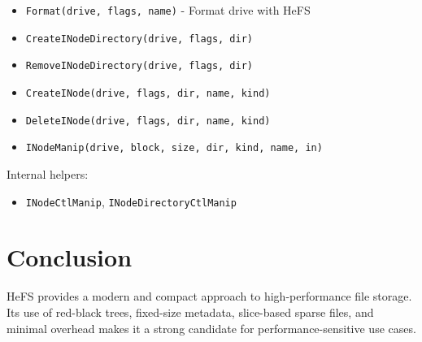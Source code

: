 \documentclass{article}
\begin{document}
\begin{itemize}
  \item \texttt{Format(drive, flags, name)} - Format drive with HeFS
  \item \texttt{CreateINodeDirectory(drive, flags, dir)}
  \item \texttt{RemoveINodeDirectory(drive, flags, dir)}
  \item \texttt{CreateINode(drive, flags, dir, name, kind)}
  \item \texttt{DeleteINode(drive, flags, dir, name, kind)}
  \item \texttt{INodeManip(drive, block, size, dir, kind, name, in)}
\end{itemize}

Internal helpers:
\begin{itemize}
  \item \texttt{INodeCtlManip}, \texttt{INodeDirectoryCtlManip}
\end{itemize}

\section{Conclusion}
HeFS provides a modern and compact approach to high-performance file storage.
Its use of red-black trees, fixed-size metadata, slice-based sparse files, and minimal overhead makes it a strong candidate for performance-sensitive use cases.
\end{document}
